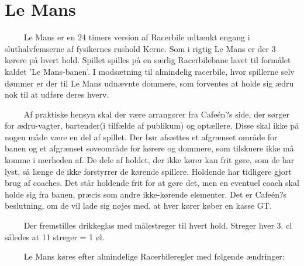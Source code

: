 \documentclass[12pt]{article}
\begin{document}
\section*{Le Mans}

$\qquad$ Le Mans er en 24 timers version af Racerbile udtænkt engang i sluthalvfemserne af fysikernes rushold Kerne. Som i rigtig Le Mans er der 3 kørere på hvert hold. Spillet spilles på en særlig Racerbilebane lavet til formålet kaldet 'Le Mans-banen'. I modsætning til almindelig racerbile, hvor spillerne selv dømmer er der til Le Mans udnævnte dommere, som forventes at holde sig ædru nok til at udføre deres hverv.

$\qquad$ Af praktiske hensyn skal der være arrangører fra Cafeén?s side, der sørger for ædru-vagter, bartender(i tilfælde af publikum) og optællere. Disse skal ikke på nogen måde være en del af spillet. Der bør afsættes et afgrænset område for banen og et afgrænset soveområde for kørere og dommere, som tilskuere ikke må komme i nærheden af. De dele af holdet, der ikke kører kan frit gøre, som de har lyst, så længe de ikke forstyrrer de kørende spillere. Holdende har tidligere gjort brug af coaches. Det står holdende frit for at gøre det, men en eventuel coach skal holde sig fra banen, præcis som andre ikke-kørende elementer. Det er Cafeén?s beslutning, om de vil lade sig nøjes med, at hver kører køber en kasse GT.

$\qquad$ Der fremstilles drikkeglas med målestreger til hvert hold. Streger hver 3. cl således at 11 streger = 1 øl.

$\qquad$ Le Mans køres efter almindelige Racerbileregler med følgende ændringer:
\end{document}
